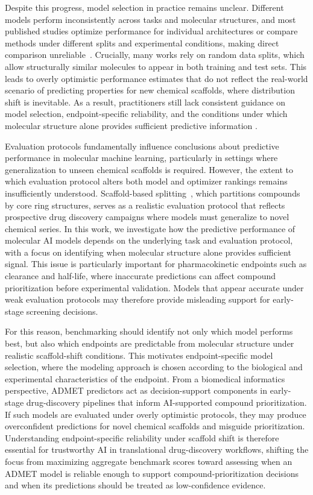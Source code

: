 \documentclass[journal]{IEEEtran}
\begin{document}
Despite this progress, model selection in practice remains unclear. Different models perform inconsistently across tasks and molecular structures, and most published studies optimize performance for individual architectures or compare methods under different splits and experimental conditions, making direct comparison unreliable~\cite{wu2018moleculenet, yang2019dmpnn}. Crucially, many works rely on random data splits, which allow structurally similar molecules to appear in both training and test sets. This leads to overly optimistic performance estimates that do not reflect the real-world scenario of predicting properties for new chemical scaffolds, where distribution shift is inevitable. As a result, practitioners still lack consistent guidance on model selection, endpoint-specific reliability, and the conditions under which molecular structure alone provides sufficient predictive information \cite{wu2018moleculenet, huang2021therapeuticsdatacommonsmachine}.

Evaluation protocols fundamentally influence conclusions about predictive performance in molecular machine learning, particularly in settings where generalization to unseen chemical scaffolds is required. However, the extent to which evaluation protocol alters both model and optimizer rankings remains insufficiently understood. Scaffold-based splitting~\cite{doi:10.1021/jm9602928}, which partitions compounds by core ring structures, serves as a realistic evaluation protocol that reflects prospective drug discovery campaigns where models must generalize to novel chemical series. In this work, we investigate how the predictive performance of molecular AI models depends on the underlying task and evaluation protocol, with a focus on identifying when molecular structure alone provides sufficient signal. This issue is particularly important for pharmacokinetic endpoints such as clearance and half-life, where inaccurate predictions can affect compound prioritization before experimental validation. Models that appear accurate under weak evaluation protocols may therefore provide misleading support for early-stage screening decisions.

For this reason, benchmarking should identify not only which model performs best, but also which endpoints are predictable from molecular structure under realistic scaffold-shift conditions. This motivates endpoint-specific model selection, where the modeling approach is chosen according to the biological and experimental characteristics of the endpoint. From a biomedical informatics perspective, ADMET predictors act as decision-support components in early-stage drug-discovery pipelines that inform AI-supported compound prioritization. If such models are evaluated under overly optimistic protocols, they may produce overconfident predictions for novel chemical scaffolds and misguide prioritization. Understanding endpoint-specific reliability under scaffold shift is therefore essential for trustworthy AI in translational drug-discovery workflows, shifting the focus from maximizing aggregate benchmark scores toward assessing when an ADMET model is reliable enough to support compound-prioritization decisions and when its predictions should be treated as low-confidence evidence.
\end{document}
